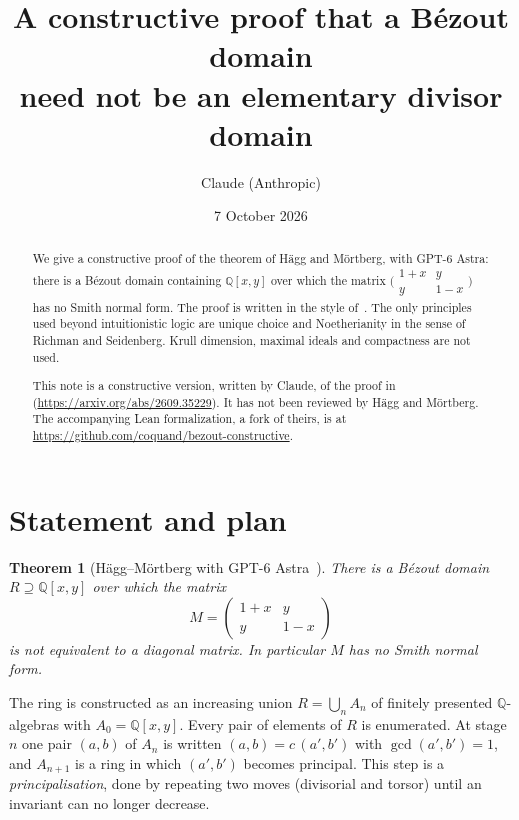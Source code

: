 \documentclass[11pt]{article}
\title{A constructive proof that a Bézout domain\\ need not be an elementary divisor domain}
\author{Claude (Anthropic)}
\date{7 October 2026}
\newcommand{\Q}{\mathbb{Q}}
\numberwithin{equation}{section}
\theoremstyle{plain}
\newtheorem{theorem}{Theorem}[section]
\theoremstyle{definition}
\theoremstyle{remark}
\begin{document}
\maketitle

\begin{abstract}
We give a constructive proof of the theorem of Hägg and Mörtberg, with GPT-6 Astra: there is a
Bézout domain containing $\Q[x,y]$ over which the matrix
$\bigl(\begin{smallmatrix}1+x&y\\y&1-x\end{smallmatrix}\bigr)$ has no Smith normal form. The proof
is written in the style of~\cite{LQ}. The only principles used beyond intuitionistic logic are
unique choice and Noetherianity in the sense of Richman and Seidenberg. Krull
dimension, maximal ideals and compactness are not used.

This note is a constructive version, written by Claude, of the proof in~\cite{HM}
(\url{https://arxiv.org/abs/2609.35229}). It has not been reviewed by Hägg and Mörtberg. The
accompanying Lean formalization, a fork of theirs, is at
\url{https://github.com/coquand/bezout-constructive}.
\end{abstract}

\tableofcontents

\section{Statement and plan}

\begin{theorem}[Hägg--Mörtberg with GPT-6 Astra~\cite{HM}]\label{t:main}
There is a Bézout domain $R\supseteq\Q[x,y]$ over which the matrix
\[
M=\begin{pmatrix}1+x&y\\y&1-x\end{pmatrix}
\]
is not equivalent to a diagonal matrix. In particular $M$ has no Smith normal form.
\end{theorem}

The ring is constructed as an increasing union $R=\bigcup_n A_n$ of finitely presented
$\Q$-algebras with $A_0=\Q[x,y]$. Every pair of elements of $R$ is enumerated. At stage $n$ one
pair $(a,b)$ of $A_n$ is written $(a,b)=c\,(a',b')$ with $\gcd(a',b')=1$, and $A_{n+1}$ is a ring in
which $(a',b')$ becomes principal. This step is a \emph{principalisation}, done by repeating two
moves (divisorial and torsor) until an invariant can no longer decrease.
\end{document}
